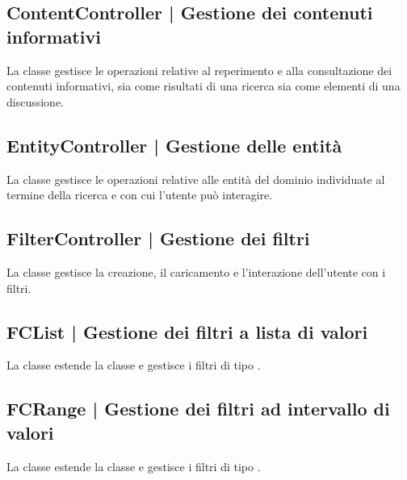 \documentclass[10pt,a4paper,headinclude,footinclude,hidelinks]{scrreprt} %
\begin{document}
	\subsection[ContentController]{ContentController | Gestione dei contenuti informativi}
	\label{sec:stage:design:controller:content}
	La classe \textit{} gestisce le operazioni relative al reperimento e alla consultazione dei contenuti informativi, sia come risultati di una ricerca sia come elementi di una discussione.

	\subsection[EntityController]{EntityController | Gestione delle entità}
	\label{sec:stage:design:controller:entity}
	La classe \textit{} gestisce le operazioni relative alle entità del dominio individuate al termine della ricerca e con cui l'utente può interagire.

	\subsection[FilterController]{FilterController | Gestione dei filtri}
	\label{sec:stage:design:controller:filter}
	La classe \textit{} gestisce la creazione, il caricamento e l'interazione dell'utente con i filtri.

	\subsection[FCList]{FCList | Gestione dei filtri a lista di valori}
	\label{sec:stage:design:controller:filter-list}
	La classe \textit{} estende la classe \textit{} e gestisce i filtri di tipo \textit{}.

	\subsection[FCRange]{FCRange | Gestione dei filtri ad intervallo di valori}
	\label{sec:stage:design:controller:filter-range}
	La classe \textit{} estende la classe \textit{} e gestisce i filtri di tipo \textit{}.
\end{document}
